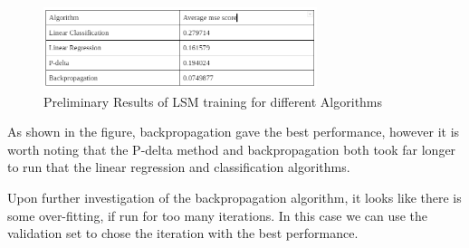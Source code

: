 \documentclass[fleqn,12pt]{wlscirep}
\begin{document}
\begin{figure}[ht]
    \includegraphics[width=8cm]{algoComp.png}
    \centering
    \caption{Preliminary Results of LSM training for different Algorithms}
    \label{fig:trainingAlgoResults}
\end{figure}

As shown in the figure, backpropagation gave the best performance, however it is worth noting that the P-delta method and backpropagation both took far longer to run that the linear regression and classification algorithms. 

\begin{figure}[ht]
    \centering
    \qquad
    \label{fig:LSMAnalysis}
\end{figure}

Upon further investigation of the backpropagation algorithm, it looks like there is some over-fitting, if run for too many iterations. In this case we can use the validation set to chose the iteration with the best performance.
\end{document}
